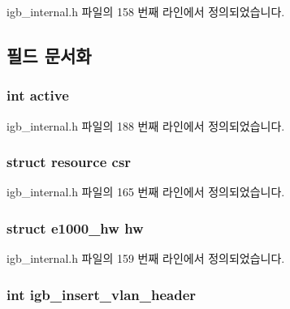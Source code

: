 igb\+\_\+internal.\+h 파일의 158 번째 라인에서 정의되었습니다.



\subsection{필드 문서화}
\subsubsection[{\texorpdfstring{active}{active}}]{\setlength{\rightskip}{0pt plus 5cm}int active}\hypertarget{structadapter_aa5805c5e936174e5092bf7a5b78e7e64}{}\label{structadapter_aa5805c5e936174e5092bf7a5b78e7e64}


igb\+\_\+internal.\+h 파일의 188 번째 라인에서 정의되었습니다.

\subsubsection[{\texorpdfstring{csr}{csr}}]{\setlength{\rightskip}{0pt plus 5cm}struct {\bf resource} csr}\hypertarget{structadapter_a0ca05bc0e64b6eb88e6fb380b688af4e}{}\label{structadapter_a0ca05bc0e64b6eb88e6fb380b688af4e}


igb\+\_\+internal.\+h 파일의 165 번째 라인에서 정의되었습니다.

\subsubsection[{\texorpdfstring{hw}{hw}}]{\setlength{\rightskip}{0pt plus 5cm}struct {\bf e1000\+\_\+hw} hw}\hypertarget{structadapter_a7d5953861471302be6287c989e0b20ba}{}\label{structadapter_a7d5953861471302be6287c989e0b20ba}


igb\+\_\+internal.\+h 파일의 159 번째 라인에서 정의되었습니다.

\subsubsection[{\texorpdfstring{igb\+\_\+insert\+\_\+vlan\+\_\+header}{igb_insert_vlan_header}}]{\setlength{\rightskip}{0pt plus 5cm}int igb\+\_\+insert\+\_\+vlan\+\_\+header}\hypertarget{structadapter_a4051a7d0614eaeb9d13dbbafd2813fcb}{}\label{structadapter_a4051a7d0614eaeb9d13dbbafd2813fcb}


